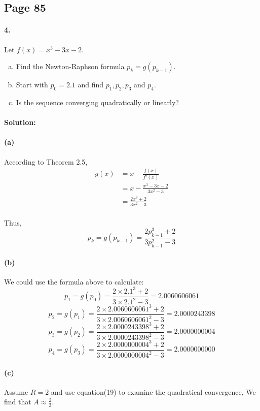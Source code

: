 \documentclass{article}  %
\begin{document}
        \subsection*{Page 85}
        \paragraph{4.}Let $f(x) = x^3 - 3x -2$.
        \begin{enumerate}[(a)]
            \item Find the Newton-Raphson formula $p_k = g(p_{k-1})$.
            \item Start with $p_0 = 2.1$ and find $p_1, p_2, p_3$ and $p_4$.
            \item Is the sequence converging quadratically or linearly?
        \end{enumerate}
        \paragraph{Solution:}
        \paragraph{(a)}According to Theorem 2.5,
        \begin{align*}
        g(x) &= x - \frac{f(x)}{f'(x)} \\
        &= x - \frac{x^3 - 3x -2}{3x^2 - 3} \\
        &= \frac{2x^3 + 2}{3x^2 - 3}
        \end{align*}
        \paragraph{}Thus,
        $$p_k = g(p_{k-1}) = \frac{2p_{k-1}^3 + 2}{3p_{k-1}^2 - 3}$$
        \paragraph{(b)}We could use the formula above to calculate:
        $$p_1 = g(p_0) = \frac{2 \times 2.1^3 + 2}{3 \times 2.1^2 - 3} = 2.0060606061$$
        $$p_2 = g(p_1) = \frac{2 \times 2.0060606061^3 + 2}{3 \times 2.0060606061^2 - 3} = 2.0000243398$$
        $$p_3 = g(p_2) = \frac{2 \times 2.0000243398^3 + 2}{3 \times 2.0000243398^2 - 3} = 2.0000000004$$
        $$p_4 = g(p_3) = \frac{2 \times 2.0000000004^3 + 2}{3 \times 2.0000000004^2 - 3} = 2.0000000000$$        
        \paragraph{(c)}Assume $R = 2$ and use equation(19) to examine the quadratical convergence, We find that $A \approx \frac{2}{3}$.
\end{document}
